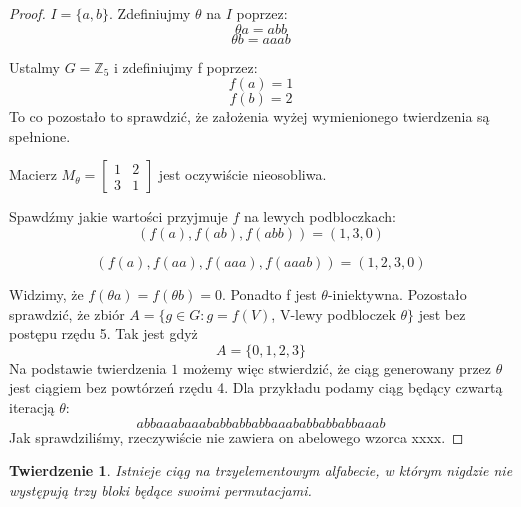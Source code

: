 \documentclass[12pt,a4paper]{amsart}
\newtheorem{theorem}{Twierdzenie}
\begin{document}
\begin{proof}
$I = \{a, b\}$. Zdefiniujmy $\theta$ na $I$ poprzez:
\begin{equation}
\theta a = abb
\end{equation}
\begin{equation}
\theta b = aaab
\end{equation}

Ustalmy $G = \mathbb{Z}_5$ i zdefiniujmy f poprzez:
\begin{equation}
f(a) = 1
\end{equation}
\begin{equation}
f(b) = 2
\end{equation}
To co pozostało to sprawdzić, że założenia wyżej wymienionego twierdzenia są spełnione.

Macierz $M_{\theta} = \begin{bmatrix}
1 & 2 \\
3 & 1 
\end{bmatrix}  $
jest oczywiście nieosobliwa.

Spawdźmy jakie wartości przyjmuje $f$ na lewych podbloczkach:
\begin{equation}
(f(a), f(ab), f(abb)) = (1, 3, 0)
\end{equation}

\begin{equation}
(f(a), f(aa), f(aaa), f(aaab)) = (1, 2, 3, 0)
\end{equation}

Widzimy, że $f(\theta a) = f(\theta b) = 0$. Ponadto f jest $\theta$-iniektywna. Pozostało sprawdzić, że zbiór  $A = \{g \in G: g=f(V)$, V-lewy podbloczek $\theta\}$ jest bez postępu rzędu 5. Tak jest gdyż
\begin{equation}
A = \{0, 1, 2, 3\}
\end{equation}
Na podstawie twierdzenia $1$ możemy więc stwierdzić, że ciąg generowany przez $\theta$ jest ciągiem bez powtórzeń rzędu 4. Dla przykładu podamy ciąg będący czwartą iteracją $\theta$:
\begin{equation}
abbaaabaaababbabbabbaaababbabbabbaaab
\end{equation}
Jak sprawdziliśmy, rzeczywiście nie zawiera on abelowego wzorca xxxx.
\end{proof}

\begin{theorem}
Istnieje ciąg na trzyelementowym alfabecie, w którym nigdzie nie występują trzy bloki będące swoimi permutacjami. 
\end{theorem}
\end{document}
